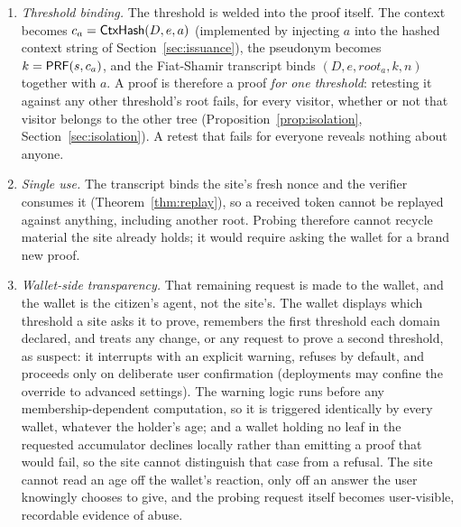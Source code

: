\documentclass[11pt]{article}
\theoremstyle{definition}
\begin{document}
\begin{enumerate}[leftmargin=2em]
\item \emph{Threshold binding.} The threshold is welded into the proof itself. The
context becomes $c_a = \mathsf{CtxHash}(D, e, a)$ (implemented by injecting $a$ into the hashed
context string of Section~\ref{sec:issuance}), the pseudonym becomes $k = \mathsf{PRF}(s, c_a)$,
and the Fiat-Shamir transcript binds $(D, e, \mathit{root}_a, k, n)$ together with $a$. A
proof is therefore a proof \emph{for one threshold}: retesting it against any other
threshold's root fails, for every visitor, whether or not that visitor belongs to the
other tree (Proposition~\ref{prop:isolation}, Section~\ref{sec:isolation}). A retest that
fails for everyone reveals nothing about anyone.
\item \emph{Single use.} The transcript binds the site's fresh nonce and the verifier
consumes it (Theorem~\ref{thm:replay}), so a received token cannot be replayed against
anything, including another root. Probing therefore cannot recycle material the site
already holds; it would require asking the wallet for a brand new proof.
\item \emph{Wallet-side transparency.} That remaining request is made to the wallet, and
the wallet is the citizen's agent, not the site's. The wallet displays which threshold a
site asks it to prove, remembers the first threshold each domain declared, and treats any
change, or any request to prove a second threshold, as suspect: it interrupts with an
explicit warning, refuses by default, and proceeds only on deliberate user confirmation
(deployments may confine the override to advanced settings). The warning logic runs
before any membership-dependent computation, so it is triggered identically by every
wallet, whatever the holder's age; and a wallet holding no leaf in the requested
accumulator declines locally rather than emitting a proof that would fail, so the site
cannot distinguish that case from a refusal. The site cannot read an age off the wallet's reaction,
only off an answer the user knowingly chooses to give, and the probing request itself
becomes user-visible, recordable evidence of abuse.
\end{enumerate}
\end{document}
